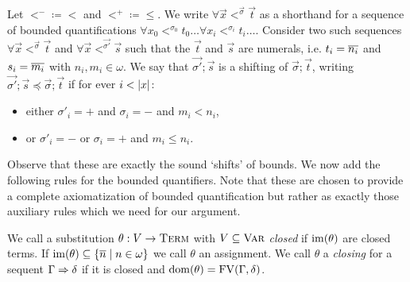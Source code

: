 Let $<^{-} \coloneq <$ and $<^{+} \coloneq \leq$. We write $\forall \vec{x}
<^{\vec{\sigma}} \vec{t}$ as a shorthand for a sequence of bounded quantifications $\forall x_0 <^{\sigma_0} t_0
\ldots \forall x_i <^{\sigma_i} t_i \ldots$. Consider two such sequences
$\forall \vec{x} <^{\vec{\sigma}} \vec{t}$ and $\forall \vec{x} <^{\vec{\sigma'}}
\vec{s}$ such that the $\vec{t}$ and $\vec{s}$ are numerals, i.e. $t_i = \ol{n_i}$
and $s_i = \ol{m_i}$ with $n_i, m_i \in \omega$. We say that $\vec{\sigma'} ;
\vec{s}$ is a shifting of $\vec{\sigma} ; \vec{t}$, writing $\vec{\sigma'} ;
\vec{s} \preceq \vec{\sigma} ; \vec{t}$ if for ever $i < \abs{x}$:
\begin{itemize}
\item either $\sigma'_i = +$ and $\sigma_i = -$ and $m_i < n_i$,
\item or $\sigma'_i = -$ or $\sigma_i = +$ and $m_i \leq n_i$.
\end{itemize}
Observe that these are exactly the sound `shifts' of bounds.
We now add the following rules for the bounded quantifiers. Note that these are
chosen to provide a complete axiomatization of bounded quantification but rather
as exactly those auxiliary rules which we need for our argument.
\begin{mathpar}



\end{mathpar}


We call a substitution $\theta : V \to \term$ with $V \subseteq \var$
\emph{closed} if $\im(\theta)$ are closed terms. If $\im(\theta) \subseteq
\{\ol{n} \mid n \in \omega \}$ we call $\theta$ an assignment.
We call $\theta$ a \emph{closing} for a sequent $\Gamma \sdash
\delta$ if it is closed and $\dom(\theta) = \FV(\Gamma, \delta)$.

